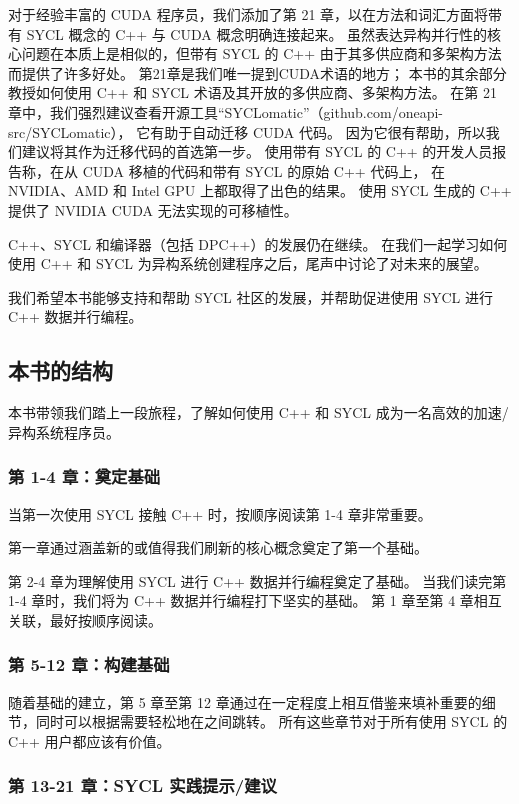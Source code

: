 对于经验丰富的 CUDA 程序员，我们添加了第 21 章，以在方法和词汇方面将带有 SYCL 概念的 C++ 与 CUDA 概念明确连接起来。 
虽然表达异构并行性的核心问题在本质上是相似的，但带有 SYCL 的 C++ 由于其多供应商和多架构方法而提供了许多好处。 
第21章是我们唯一提到CUDA术语的地方； 本书的其余部分教授如何使用 C++ 和 SYCL 术语及其开放的多供应商、多架构方法。 
在第 21 章中，我们强烈建议查看开源工具“SYCLomatic”（github.com/oneapi-src/SYCLomatic），
它有助于自动迁移 CUDA 代码。 因为它很有帮助，所以我们建议将其作为迁移代码的首选第一步。 
使用带有 SYCL 的 C++ 的开发人员报告称，在从 CUDA 移植的代码和带有 SYCL 的原始 C++ 代码上，
在 NVIDIA、AMD 和 Intel GPU 上都取得了出色的结果。 
使用 SYCL 生成的 C++ 提供了 NVIDIA CUDA 无法实现的可移植性。

C++、SYCL 和编译器（包括 DPC++）的发展仍在继续。 
在我们一起学习如何使用 C++ 和 SYCL 为异构系统创建程序之后，尾声中讨论了对未来的展望。

我们希望本书能够支持和帮助 SYCL 社区的发展，并帮助促进使用 SYCL 进行 C++ 数据并行编程。

\subsection*{本书的结构}
本书带领我们踏上一段旅程，了解如何使用 C++ 和 SYCL 成为一名高效的加速/异构系统程序员。

\subsubsection*{第 1-4 章：奠定基础}
当第一次使用 SYCL 接触 C++ 时，按顺序阅读第 1-4 章非常重要。

第一章通过涵盖新的或值得我们刷新的核心概念奠定了第一个基础。

第 2-4 章为理解使用 SYCL 进行 C++ 数据并行编程奠定了基础。 
当我们读完第 1-4 章时，我们将为 C++ 数据并行编程打下坚实的基础。 第 1 章至第 4 章相互关联，最好按顺序阅读。

\subsubsection*{第 5-12 章：构建基础}

随着基础的建立，第 5 章至第 12 章通过在一定程度上相互借鉴来填补重要的细节，同时可以根据需要轻松地在之间跳转。 
所有这些章节对于所有使用 SYCL 的 C++ 用户都应该有价值。

\subsubsection*{第 13-21 章：SYCL 实践提示/建议}

